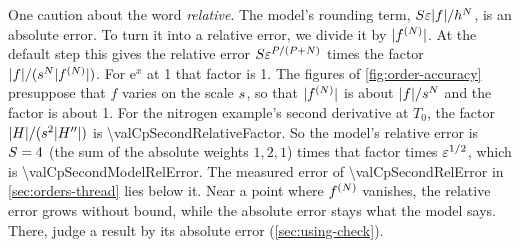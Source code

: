 One caution about the word \emph{relative}. The model's rounding term, $S \varepsilon \lvert f \rvert / h^{N}$, is an
absolute error. To turn it into a relative error, we divide it by $\lvert f^{(N)} \rvert$. At the default step this
gives the relative error $S \varepsilon^{P/(P + N)}$ times the factor
$\lvert f \rvert / (s^{N} \lvert f^{(N)} \rvert)$. For $\mathrm{e}^x$ at 1 that factor is 1. The figures of
\cref{fig:order-accuracy} presuppose that $f$ varies on the scale $s$, so that $\lvert f^{(N)} \rvert$ is about
$\lvert f \rvert / s^{N}$ and the factor is about 1. For the nitrogen example's second derivative at $T_0$, the
factor $\lvert H \rvert / (s^2 \lvert H'' \rvert)$ is \num{\valCpSecondRelativeFactor}. So the model's relative error is
$S = 4$ (the sum of the absolute weights $1, 2, 1$) times that factor times $\varepsilon^{1/2}$, which is
\num{\valCpSecondModelRelError}. The measured error of \num{\valCpSecondRelError} in \cref{sec:orders-thread} lies
below it. Near a point where $f^{(N)}$ vanishes, the relative error grows without bound, while the absolute
error stays what the model says. There, judge a result by its absolute error (\cref{sec:using-check}).

